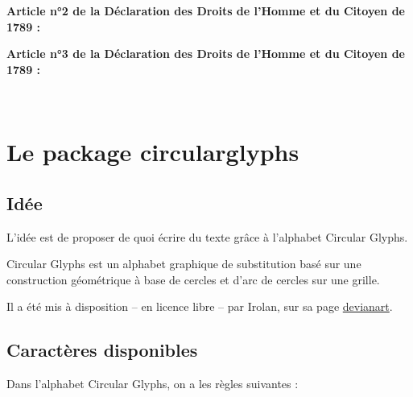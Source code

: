 \documentclass[french,11pt,a4paper]{article}
\begin{document}
\medskip


\bigskip

\textbf{Article n°2 de la Déclaration des Droits de l'Homme et du Citoyen de 1789 : }

\medskip

{\LARGE{}}

\bigskip

\textbf{Article n°3 de la Déclaration des Droits de l'Homme et du Citoyen de 1789 : }

\medskip

{\large{}}

\vfill~

\pagebreak

\section{Le package circularglyphs}

\subsection{Idée}

L'idée est de proposer de quoi écrire du texte grâce à l'alphabet \textsf{Circular Glyphs}.

\smallskip

\textsf{Circular Glyphs} est un alphabet graphique de substitution basé sur une construction géométrique à base de cercles et d'arc de cercles sur une grille.

Il a été mis à disposition -- en licence libre -- par \textsf{Irolan}, sur sa page \href{https://www.deviantart.com/irolan/art/Circular-Glyphs-479352599}{devianart}.

\subsection{Caractères disponibles}

Dans l'alphabet \textsf{Circular Glyphs}, on a les règles suivantes :
\end{document}
